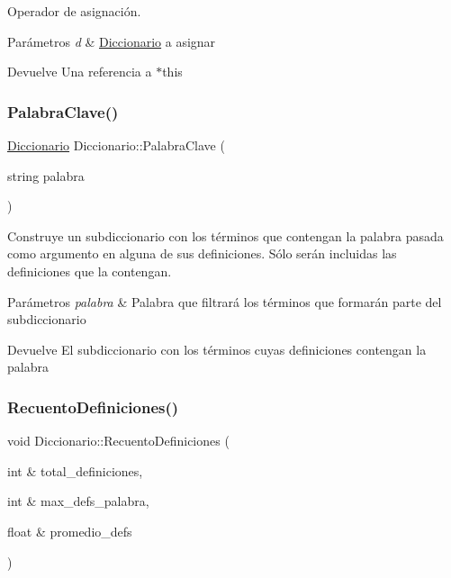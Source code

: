 Operador de asignación. 


\begin{DoxyParams}{Parámetros}
{\em d} & \mbox{\hyperlink{classDiccionario}{Diccionario}} a asignar \\
\hline
\end{DoxyParams}
\begin{DoxyReturn}{Devuelve}
Una referencia a $\ast$this 
\end{DoxyReturn}
\mbox{\label{classDiccionario_a93ebea1ecbe24d1f54a3e75223f90fbf}} 
\subsubsection{\texorpdfstring{PalabraClave()}{PalabraClave()}}
{\footnotesize\ttfamily \mbox{\hyperlink{classDiccionario}{Diccionario}} Diccionario\+::\+Palabra\+Clave (\begin{DoxyParamCaption}\item[{string}]{palabra }\end{DoxyParamCaption})}



Construye un subdiccionario con los términos que contengan la palabra pasada como argumento en alguna de sus definiciones. Sólo serán incluidas las definiciones que la contengan. 


\begin{DoxyParams}{Parámetros}
{\em palabra} & Palabra que filtrará los términos que formarán parte del subdiccionario \\
\hline
\end{DoxyParams}
\begin{DoxyReturn}{Devuelve}
El subdiccionario con los términos cuyas definiciones contengan la palabra 
\end{DoxyReturn}
\mbox{\label{classDiccionario_abbd34340d309f6217e52d647b3d40b1c}} 
\subsubsection{\texorpdfstring{RecuentoDefiniciones()}{RecuentoDefiniciones()}}
{\footnotesize\ttfamily void Diccionario\+::\+Recuento\+Definiciones (\begin{DoxyParamCaption}\item[{int \&}]{total\+\_\+definiciones,  }\item[{int \&}]{max\+\_\+defs\+\_\+palabra,  }\item[{float \&}]{promedio\+\_\+defs }\end{DoxyParamCaption})}



